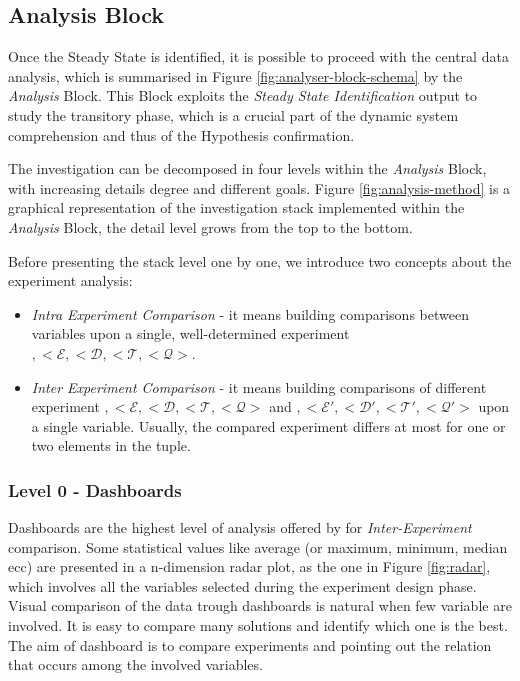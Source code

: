 \subsection{Analysis Block}\label{sec:analyser-analysis-block}

Once the Steady State is identified, it is possible to proceed with the central data analysis, which is summarised in Figure \ref{fig:analyser-block-schema} by the \textit{Analysis} Block. This Block exploits the \textit{Steady State Identification} output to study the transitory phase, which is a crucial part of the dynamic system comprehension and thus of the Hypothesis confirmation.

The investigation can be decomposed in four levels within the \textit{Analysis} Block, with increasing details degree and different goals.  Figure \ref{fig:analysis-method} is a graphical representation of the investigation stack implemented within the \textit{Analysis} Block, the detail level grows from the top to the bottom.

Before presenting the stack level one by one, we introduce two concepts about the experiment analysis:
\begin{itemize}
\item \textit{Intra Experiment Comparison} -  it means building comparisons between variables upon a single, well-determined experiment $,<\mathcal{E},<\mathcal{D},<\mathcal{T},<\mathcal{Q}>$.
\item \textit{Inter Experiment Comparison} -  it means building comparisons of different experiment 
$,<\mathcal{E},<\mathcal{D},<\mathcal{T},<\mathcal{Q}>$ and $,<\mathcal{E}',<\mathcal{D}',<\mathcal{T}',<\mathcal{Q}'>$ upon a single variable. Usually, the compared experiment differs at most for one or two elements in the tuple. 
\end{itemize}


\subsubsection{Level 0 - Dashboards}\label{sec:heaven-level0}

Dashboards are the highest level of analysis offered by \name for \textit{Inter-Experiment} comparison. Some statistical values like average (or maximum, minimum, median ecc) are presented in a n-dimension radar plot, as the one in Figure \ref{fig:radar}, which involves all the variables selected during the experiment design phase. Visual comparison of the data trough dashboards is natural when few variable are involved. It is easy to compare many solutions and identify which one is the best. The aim of dashboard is to compare experiments and pointing out the relation that occurs among the involved variables.

